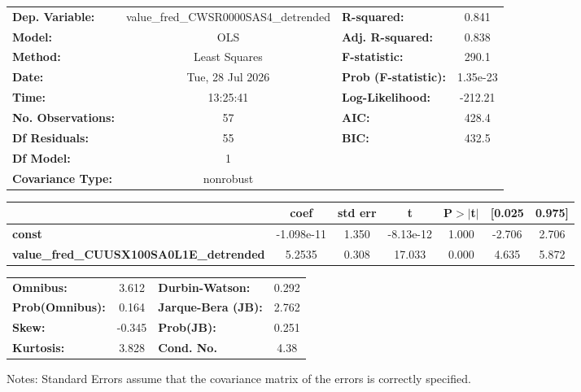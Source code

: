 \begin{center}
\begin{tabular}{lclc}
\toprule
\textbf{Dep. Variable:}                         & value\_fred\_CWSR0000SAS4\_detrended & \textbf{  R-squared:         } &     0.841   \\
\textbf{Model:}                                 &                 OLS                  & \textbf{  Adj. R-squared:    } &     0.838   \\
\textbf{Method:}                                &            Least Squares             & \textbf{  F-statistic:       } &     290.1   \\
\textbf{Date:}                                  &           Tue, 28 Jul 2026           & \textbf{  Prob (F-statistic):} &  1.35e-23   \\
\textbf{Time:}                                  &               13:25:41               & \textbf{  Log-Likelihood:    } &   -212.21   \\
\textbf{No. Observations:}                      &                    57                & \textbf{  AIC:               } &     428.4   \\
\textbf{Df Residuals:}                          &                    55                & \textbf{  BIC:               } &     432.5   \\
\textbf{Df Model:}                              &                     1                & \textbf{                     } &             \\
\textbf{Covariance Type:}                       &              nonrobust               & \textbf{                     } &             \\
\bottomrule
\end{tabular}
\begin{tabular}{lcccccc}
                                                & \textbf{coef} & \textbf{std err} & \textbf{t} & \textbf{P$> |$t$|$} & \textbf{[0.025} & \textbf{0.975]}  \\
\midrule
\textbf{const}                                  &   -1.098e-11  &        1.350     & -8.13e-12  &         1.000        &       -2.706    &        2.706     \\
\textbf{value\_fred\_CUUSX100SA0L1E\_detrended} &       5.2535  &        0.308     &    17.033  &         0.000        &        4.635    &        5.872     \\
\bottomrule
\end{tabular}
\begin{tabular}{lclc}
\textbf{Omnibus:}       &  3.612 & \textbf{  Durbin-Watson:     } &    0.292  \\
\textbf{Prob(Omnibus):} &  0.164 & \textbf{  Jarque-Bera (JB):  } &    2.762  \\
\textbf{Skew:}          & -0.345 & \textbf{  Prob(JB):          } &    0.251  \\
\textbf{Kurtosis:}      &  3.828 & \textbf{  Cond. No.          } &     4.38  \\
\bottomrule
\end{tabular}
\end{center}

Notes: \newline
 [1] Standard Errors assume that the covariance matrix of the errors is correctly specified.